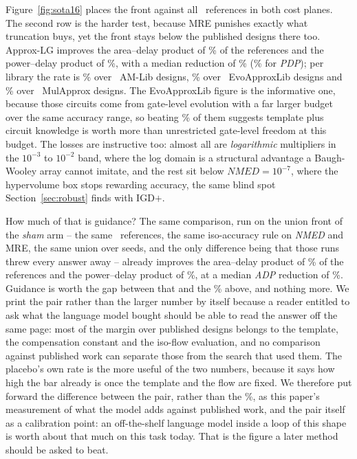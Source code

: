 \documentclass[acmsmall,review,anonymous]{acmart}
\newcommand{\nmed}{\textit{NMED}}
\newcommand{\adp}{\textit{ADP}}
\newcommand{\pdp}{\textit{PDP}}
\begin{document}
Figure~\ref{fig:sota16} places the front against all \NrefSixteen\ references in
both cost planes.  The second row is the harder test, because MRE punishes
exactly what truncation buys, yet the front stays below the published designs
there too.  Approx-LG improves the area--delay product of \SotaSixteenADP\% of
the references and the power--delay product of \SotaSixteenPDP\%, with a median
reduction of \MedianADPSixteen\% (\MedianPDPSixteen\% for \pdp{}); per library
the rate is \SotaAm\% over \NrefAm\ AM-Lib designs, \SotaEvo\% over \NrefEvo\
EvoApproxLib designs and \SotaMul\% over \NrefMul\ MulApprox designs.  The
EvoApproxLib figure is the informative one, because those circuits come from
gate-level evolution with a far larger budget over the same accuracy range, so
beating \SotaEvo\% of them suggests template plus circuit knowledge is worth
more than unrestricted gate-level freedom at this budget.  The losses are
instructive too: almost all are \emph{logarithmic} multipliers in the $10^{-3}$
to $10^{-2}$ band, where the log domain is a structural advantage a
Baugh-Wooley array cannot imitate, and the rest sit below
$\nmed{}=10^{-7}$, where the hypervolume box stops rewarding accuracy, the same
blind spot Section~\ref{sec:robust} finds with IGD$+$.

How much of that is guidance?  The same comparison, run on the union front of
the \emph{sham} arm -- the same \NrefShamSixteen\ references, the same
iso-accuracy rule on \nmed{} and MRE, the same union over seeds, and the only
difference being that those runs threw every answer away -- already improves the
area--delay product of \SotaShamSixteenADP\% of the references and the
power--delay product of \SotaShamSixteenPDP\%, at a median \adp{} reduction of
\MedianADPShamSixteen\%.  Guidance is worth the gap between that and the
\SotaSixteenADP\% above, and nothing more.  We print the pair rather than the
larger number by itself because a reader entitled to ask what the language
model bought should be able to read the answer off the same page: most of the
margin over published designs belongs to the template, the compensation
constant and the iso-flow evaluation, and no comparison against published work
can separate those from the search that used them.  The placebo's own rate is
the more useful of the two numbers, because it says how high the bar already is
once the template and the flow are fixed.  We therefore put forward the
difference between the pair, rather than the \SotaSixteenADP\%, as this paper's
measurement of what the model adds against published work, and the pair itself
as a calibration point: an off-the-shelf language model inside a loop of this
shape is worth about that much on this task today.  That is the figure a later
method should be asked to beat.
\end{document}
